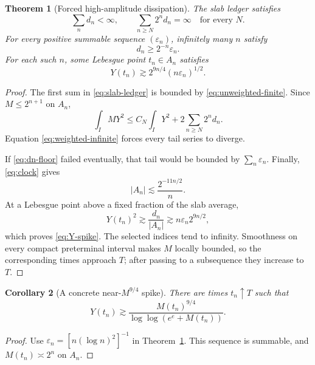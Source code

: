 \documentclass[11pt]{article}
\newtheorem{theorem}{Theorem}
\newtheorem{corollary}[theorem]{Corollary}
\theoremstyle{remark}
\begin{document}
\begin{theorem}[Forced high-amplitude dissipation]
\label{thm:slab}
The slab ledger satisfies
\begin{equation}
\label{eq:slab-ledger}
 \sum_nd_n<\infty,
 \qquad
 \boxed{
 \sum_{n\geq N}2^nd_n=\infty
 \quad\text{for every }N.
 }
\end{equation}
For every positive summable sequence \((\varepsilon_n)\), infinitely
many \(n\) satisfy
\begin{equation}
\label{eq:dn-floor}
 d_n\geq2^{-n}\varepsilon_n.
\end{equation}
For each such \(n\), some Lebesgue point \(t_n\in A_n\) satisfies
\begin{equation}
\label{eq:Y-spike}
 \boxed{
 Y(t_n)
 \gtrsim
 2^{9n/4}(n\varepsilon_n)^{1/2}.
 }
\end{equation}
\end{theorem}

\begin{proof}
The first sum in \eqref{eq:slab-ledger} is bounded by
\eqref{eq:unweighted-finite}.  Since \(M\leq2^{n+1}\) on \(A_n\),
\[
 \int_I MY^2
 \leq
 C_N\int_IY^2
 +2\sum_{n\geq N}2^nd_n.
\]
Equation \eqref{eq:weighted-infinite} forces every tail series to
diverge.

If \eqref{eq:dn-floor} failed eventually, that tail would be bounded by
\(\sum_n\varepsilon_n\).  Finally, \eqref{eq:clock} gives
\[
 |A_n|
 \lesssim
 \frac{2^{-11n/2}}{n}.
\]
At a Lebesgue point above a fixed fraction of the slab average,
\[
 Y(t_n)^2
 \gtrsim
 \frac{d_n}{|A_n|}
 \gtrsim
 n\varepsilon_n2^{9n/2},
\]
which proves \eqref{eq:Y-spike}.  The selected indices tend to infinity.
Smoothness on every compact preterminal interval makes \(M\) locally
bounded, so the corresponding times approach \(T\); after passing to a
subsequence they increase to \(T\).
\end{proof}

\begin{corollary}[A concrete near-\texorpdfstring{\(M^{9/4}\)}{M9/4}
spike]
\label{cor:concrete-spike}
There are times \(t_n\uparrow T\) such that
\begin{equation}
\label{eq:concrete-spike}
 \boxed{
 Y(t_n)
 \gtrsim
 \frac{M(t_n)^{9/4}}
 {\log\log(e^e+M(t_n))}.
 }
\end{equation}
\end{corollary}

\begin{proof}
Use
\(\varepsilon_n=[n(\log n)^2]^{-1}\) in
Theorem~\ref{thm:slab}.  This sequence is summable, and
\(M(t_n)\asymp2^n\) on \(A_n\).
\end{proof}
\end{document}
